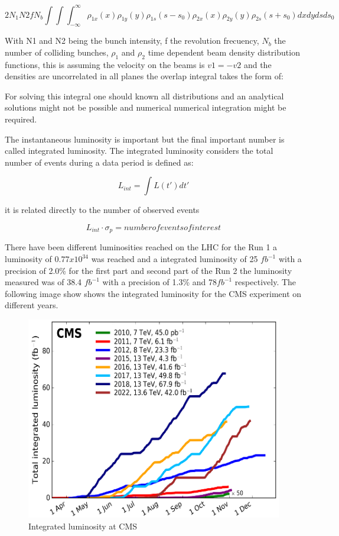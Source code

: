 
\begin{equation}
 2N_{1}N{2}fN_{b} \int \int \int^{\infty}_{-\infty}  \rho_{1x} (x) \rho_{1y}(y) \rho_{1s} (s-s_{0}) \rho_{2x}(x) \rho_{2y}(y) \rho_{2s} (s+s_{0}) dxdydsds_{0}  
\end{equation}

With N1 and N2 being the bunch intensity, f the revolution frecuency, $N_{b}$ the number of colliding bunches, $\rho_{1}$ and $\rho_{2}$ time dependent beam density distribution functions, this is assuming the velocity on the beams is $v1 = -v2$ and the densities are uncorrelated in all planes the overlap integral takes the form of: \cite{Lumvdm}

For solving this integral one should known all distributions and an analytical solutions might not be possible and numerical numerical integration might be required.


The instantaneous luminosity is important  but the final important number is called integrated luminosity. The integrated luminosity considers the total number of events during a data period is defined as: 

\begin{equation}
 L_{int} = \int L (t') dt' 
\end{equation}

it is related directly to the number of observed events 

\begin{equation}
L_{int} \cdot \sigma_{p} = number of events of interest 
\end{equation}

There have been different luminosities reached on the LHC for the Run 1 a luminosity of $0.77 x 10^{34}$ was reached and a integrated luminosity of 25 $fb^{-1}$  with a precision of 2.0\% for the first part and second part of the Run 2 the luminosity measured was of 38.4 $fb^{-1}$ with a precision of 1.3\% and 78$fb^{-1}$ respectively\cite{LHClum}.  The following image show shows the integrated luminosity for the CMS experiment on different years.  

\begin{figure}[h]
    \centering
     \includegraphics[scale=1.25]{integratedlum.png}
     \caption{Integrated luminosity at CMS}
    \label{fig:CMS-Luminosity}
\end{figure}

